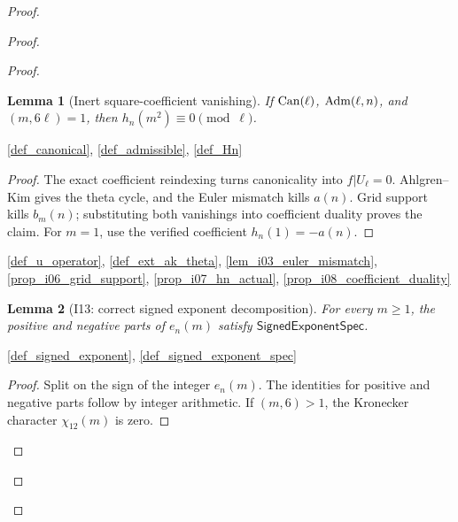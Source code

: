 \documentclass[11pt,a4paper]{article}
\numberwithin{equation}{section}
\theoremstyle{plain}\newtheorem{theorem}{Theorem}[section]\newaliascnt{proposition}{theorem}\newtheorem{proposition}[proposition]{Proposition}\aliascntresetthe{proposition}\newaliascnt{lemma}{theorem}\newtheorem{lemma}[lemma]{Lemma}\aliascntresetthe{lemma}
\theoremstyle{definition}\newaliascnt{definition}{theorem}\newtheorem{definition}[definition]{Definition}\aliascntresetthe{definition}\newaliascnt{notation}{theorem}\newtheorem{notation}[notation]{Notation}\aliascntresetthe{notation}
\providecommand{\lean}[1]{}\providecommand{\leanok}{}
\begin{document}
\begin{proof}
\begin{proof}
\begin{proof}
\begin{lemma}[Inert square-coefficient vanishing]\label{lem_square_coeff_vanish}\lean{SptCM.Analytic.Repaired.actual_square_coefficient_vanish}\leanok
If $\operatorname{Can}(\ell)$, $\operatorname{Adm}(\ell,n)$, and $(m,6\ell)=1$, then $h_n(m^2)\equiv0\pmod\ell$.
\end{lemma}
\begin{uses-statement}\ref{def_canonical}, \ref{def_admissible}, \ref{def_Hn}\end{uses-statement}
\begin{proof}
The exact coefficient reindexing turns canonicality into $f|U_\ell=0$.  Ahlgren--Kim gives the theta cycle, and the Euler mismatch kills $a(n)$.  Grid support kills $b_m(n)$; substituting both vanishings into coefficient duality proves the claim.  For $m=1$, use the verified coefficient $h_n(1)=-a(n)$.
\end{proof}
\begin{uses-proof}\ref{def_u_operator}, \ref{def_ext_ak_theta}, \ref{lem_i03_euler_mismatch}, \ref{prop_i06_grid_support}, \ref{prop_i07_hn_actual}, \ref{prop_i08_coefficient_duality}\end{uses-proof}

\begin{lemma}[I13: correct signed exponent decomposition]\label{lem_i13_signed_exponent}\lean{SptCM.Repair.signedExponentSpec}\leanok
For every $m\ge1$, the positive and negative parts of $e_n(m)$ satisfy $\mathsf{SignedExponentSpec}$.
\end{lemma}
\begin{uses-statement}\ref{def_signed_exponent}, \ref{def_signed_exponent_spec}\end{uses-statement}
\begin{proof}
Split on the sign of the integer $e_n(m)$.  The identities for positive and negative parts follow by integer arithmetic.  If $(m,6)>1$, the Kronecker character $\chi_{12}(m)$ is zero.
\end{proof}


\end{proof}
\end{proof}
\end{proof}
\end{document}
